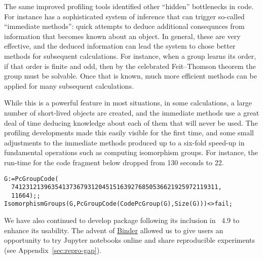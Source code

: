 %
%
%

The same improved profiling tools identified other
``hidden'' bottlenecks in \GAP code. For instance \GAP has a
sophisticated system of inference that can trigger 
so-called ``immediate methods'': quick attempts to deduce additional
consequnces from information that becomes known about an object.
In general, these are very effective, and the deduced information can
lead the system to chose better methods for subsequent
calculations. For instance, when a group learns its order, if that
order is finite and odd, then by the celebrated
Feit--Thomson theorem the group must be solvable. Once that
is known, much more efficient methods can be applied for many
subsequent calculations.

While this is a powerful feature in most situations, in some
calculations, a large number of short-lived objects are created,
and the immediate methods use a great deal of time deducing knowledge
about each of them
that will never be used. The profiling developments made this 
easily visible for the first time, and some small adjustments to the
immediate methods produced up to a six-fold speed-up in fundamental
operations such as computing isomorphism groups. For instance, the
run-time for the code fragment below dropped from 130
seconds to 22.


{\Small
\begin{verbatim}
G:=PcGroupCode( 
  741231213963541373679312045151639276850536621925972119311,
  11664);;
IsomorphismGroups(G,PcGroupCode(CodePcGroup(G),Size(G)))<>fail;
\end{verbatim}
}


We have also continued to develop package  following 
its inclusion in \GAP~4.9 to enhance its usability. The advent of
\href{https://mybinder.org/}{Binder} allowed us to give users an
opportunity to try \GAP Jupyter notebooks online 
and share reproducible \GAP experiments (see Appendix~\ref{sec:repro-gap}).

